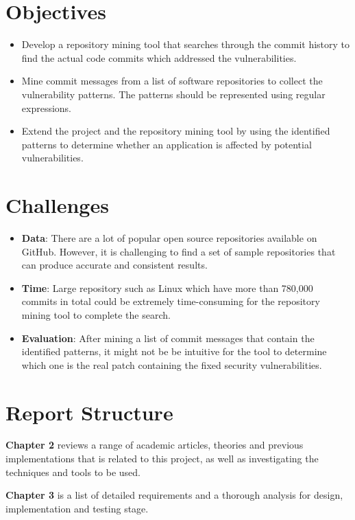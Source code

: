 \documentclass[12pt, a4paper]{report}
\begin{document}
\section{Objectives}
\label{sec:objectives}
\begin{itemize}
	\item Develop a repository mining tool that searches through the commit history to find the actual code commits which addressed the vulnerabilities.
	\item Mine commit messages from a list of software repositories to collect the vulnerability patterns. The patterns should be represented using regular expressions.
	\item Extend the project and the repository mining tool by using the identified patterns to determine whether an application is affected by potential vulnerabilities.
\end{itemize}

\section{Challenges}
\begin{itemize}
	\item \textbf{Data}: There are a lot of popular open source repositories available on GitHub. However, it is challenging to find a set of sample repositories that can produce accurate and consistent results.
	\item \textbf{Time}: Large repository such as Linux which have more than 780,000 commits in total \cite{linux_repo} could be extremely time-consuming for the repository mining tool to complete the search.
	\item \textbf{Evaluation}: After mining a list of commit messages that contain the identified patterns, it might not be be intuitive for the tool to determine which one is the real patch containing the fixed security vulnerabilities.
\end{itemize}

\section{Report Structure}
\textbf{Chapter 2} reviews a range of academic articles, theories and previous implementations that is related to this project, as well as investigating the techniques and tools to be used.

\noindent\textbf{Chapter 3} is a list of detailed requirements and a thorough analysis for design, implementation and testing stage.
\end{document}
